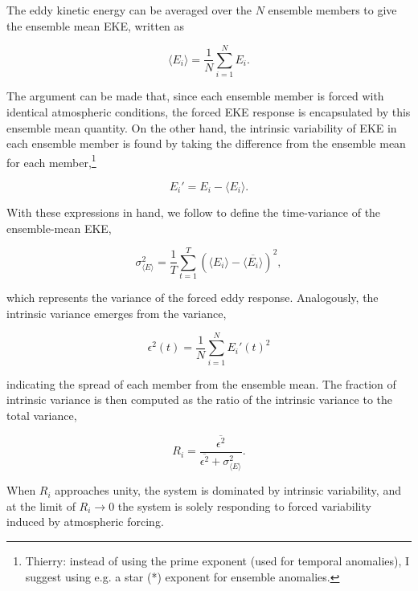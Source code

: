 \documentclass{agujournal2019}
\begin{document}
The eddy kinetic energy can be averaged over the $N$ ensemble members to give the ensemble mean EKE, written as
\begin{linenomath*}
\begin{equation}
\langle E_i \rangle = \frac{1}{N} \sum_{i=1}^N E_i.
\end{equation}
\end{linenomath*}
The argument can be made that, since each ensemble member is forced with identical atmospheric conditions, the forced EKE response is encapsulated by this ensemble mean quantity.
On the other hand, the intrinsic variability of EKE in each ensemble member is found by taking the difference from the ensemble mean for each member,\footnote{{\color{red}Thierry: instead of using the prime exponent (used for temporal anomalies), I suggest using e.g. a star (*) exponent for ensemble anomalies.}}
\begin{linenomath*}
\begin{equation}
E_i' = E_i - \langle E_i \rangle.
\end{equation}
\end{linenomath*}
With these expressions in hand, we follow \citet{Leroux2018} to define the  time-variance of the ensemble-mean EKE,
\begin{linenomath*}
\begin{equation}
\sigma^2_{\langle E \rangle} = \frac{1}{T} \sum_{t=1}^T \left(\langle E_i \rangle -  \overline{\langle E_i \rangle}\right)^2,
\end{equation}
\end{linenomath*}
which represents the variance of the forced eddy response.
Analogously, the intrinsic variance emerges from the variance,
\begin{linenomath*}
\begin{equation}
\epsilon^2(t) = \frac{1}{N} \sum_{i=1}^N E_i'(t)^2
\end{equation}
\end{linenomath*}
indicating the spread of each member from the ensemble mean.
The fraction of intrinsic variance is then computed as the ratio of the intrinsic variance to the total variance,
\begin{linenomath*}
\begin{equation}
R_i =  \frac{\overline{\epsilon^2}}{\overline{\epsilon^2} + \sigma^2_{\langle E \rangle}}.
\end{equation}
\end{linenomath*}
When $R_i$ approaches unity, the system is dominated by intrinsic variability, and at the limit  of $R_i \to 0$ the system is solely responding to forced variability induced by atmospheric forcing.
\end{document}
